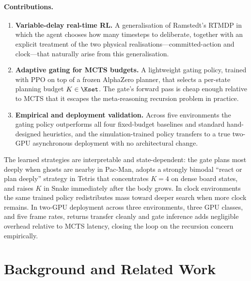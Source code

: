 \paragraph{Contributions.}
\begin{enumerate}
  \item \textbf{Variable-delay real-time RL.}
    A generalisation of Ramstedt's RTMDP in which the agent chooses how
    many timesteps to deliberate, together with an explicit treatment of
    the two physical realisations---committed-action and clock---that
    naturally arise from this generalisation.
  \item \textbf{Adaptive gating for MCTS budgets.}
    A lightweight gating policy, trained with PPO on top of a frozen
    AlphaZero planner, that selects a per-state planning budget
    $K \in \Kset$.
    The gate's forward pass is cheap enough relative to MCTS that it
    escapes the meta-reasoning recursion problem in practice.
  \item \textbf{Empirical and deployment validation.}
    Across five environments the gating policy outperforms all four
    fixed-budget baselines and standard hand-designed heuristics, and
    the simulation-trained policy transfers to a true two-GPU
    asynchronous deployment with no architectural change.
\end{enumerate}

The learned strategies are interpretable and state-dependent: the gate
plans most deeply when ghosts are nearby in Pac-Man, adopts a strongly
bimodal ``react or plan deeply'' strategy in Tetris that concentrates
$K{=}4$ on dense board states, and raises $K$ in Snake immediately after
the body grows.
In clock environments the same trained policy redistributes mass toward
deeper search when more clock remains.
In two-GPU deployment across three environments, three GPU classes, and
five frame rates, returns transfer cleanly and gate inference adds
negligible overhead relative to MCTS latency, closing the loop on the
recursion concern empirically.


\section{Background and Related Work}

